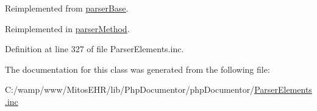 \-Reimplemented from \hyperlink{classparser_base_a9a4a6fba2208984cabb3afacadf33919}{parser\-Base}.



\-Reimplemented in \hyperlink{classparser_method_a9a4a6fba2208984cabb3afacadf33919}{parser\-Method}.



\-Definition at line 327 of file \-Parser\-Elements.\-inc.



\-The documentation for this class was generated from the following file\-:\begin{DoxyCompactItemize}
\item 
\-C\-:/wamp/www/\-Mitos\-E\-H\-R/lib/\-Php\-Documentor/php\-Documentor/\hyperlink{_parser_elements_8inc}{\-Parser\-Elements.\-inc}\end{DoxyCompactItemize}
